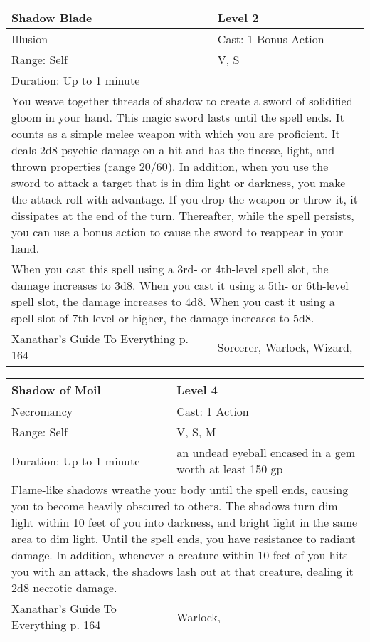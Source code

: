 \documentclass[11pt]{report}
\begin{document}
\begin{table}[H]
	\begin{tabular}{||p{6cm}|p{6cm}||}
		\hline\hline
		\bf{Shadow Blade} & Level 2\\ \hline
		Illusion & Cast: 1 Bonus Action\\ \hline
		Range: Self & V, S\\ \hline
		Duration: Up to 1 minute & \\ \hline
		\multicolumn{2}{||p{12cm}||}{You weave together threads of shadow to create a sword of solidified gloom in your hand. This magic sword lasts until the spell ends. It counts as a simple melee weapon with which you are proficient. It deals 2d8 psychic damage on a hit and has the finesse, light, and thrown properties (range 20/60). In addition, when you use the sword to attack a target that is in dim light or darkness, you make the attack roll with advantage.
If you drop the weapon or throw it, it dissipates at the end of the turn. Thereafter, while the spell persists, you can use a bonus action to cause the sword to reappear in your hand.}\\ \hline
		\multicolumn{2}{||p{12cm}||}{When you cast this spell using a 3rd- or 4th-level spell slot, the damage increases to 3d8. When you cast it using a 5th- or 6th-level spell slot, the damage increases to 4d8. When you cast it using a spell slot of 7th level or higher, the damage increases to 5d8.}\\ \hline
Xanathar's Guide To Everything p. 164 & Sorcerer, Warlock, Wizard, \\ \hline\hline
	\end{tabular}
\end{table}

\begin{table}[H]
	\begin{tabular}{||p{6cm}|p{6cm}||}
		\hline\hline
		\bf{Shadow of Moil} & Level 4\\ \hline
		Necromancy & Cast: 1 Action\\ \hline
		Range: Self & V, S, M\\ \hline
		Duration: Up to 1 minute & an undead eyeball encased in a gem worth at least 150 gp\\ \hline
		\multicolumn{2}{||p{12cm}||}{Flame-like shadows wreathe your body until the spell ends, causing you to become heavily obscured to others. The shadows turn dim light within 10 feet of you into darkness, and bright light in the same area to dim light.
Until the spell ends, you have resistance to radiant damage. In addition, whenever a creature within 10 feet of you hits you with an attack, the shadows lash out at that creature, dealing it 2d8 necrotic damage.}\\ \hline
Xanathar's Guide To Everything p. 164 & Warlock, \\ \hline\hline
	\end{tabular}
\end{table}
\end{document}
